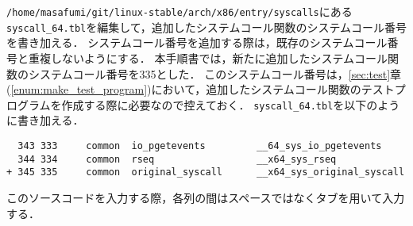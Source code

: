\documentclass[12pt]{jsarticle}
\begin{document}
\begin{enumerate}
  \verb|/home/masafumi/git/linux-stable/arch/x86/entry/syscalls|にある\verb|syscall_64.tbl|を編集して，追加したシステムコール関数のシステムコール番号を書き加える．
  システムコール番号を追加する際は，既存のシステムコール番号と重複しないようにする．
  本手順書では，新たに追加したシステムコール関数のシステムコール番号を335とした．
  このシステムコール番号は，\ref{sec:test}章(\ref{enum:make_test_program})において，追加したシステムコール関数のテストプログラムを作成する際に必要なので控えておく．
  \verb|syscall_64.tbl|を以下のように書き加える．
\begin{verbatim}
  343 333     common  io_pgetevents         __64_sys_io_pgetevents
  344 334     common  rseq                  __x64_sys_rseq
+ 345 335     common  original_syscall      __x64_sys_original_syscall
\end{verbatim}
このソースコードを入力する際，各列の間はスペースではなくタブを用いて入力する．

  


\end{enumerate}
\end{document}
